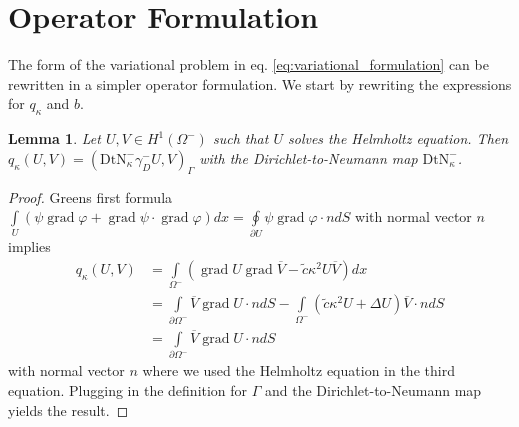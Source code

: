 \documentclass[12pt,journal,compsoc, onecolumn]{IEEEtran}
\newtheorem{lemma}[theorem]{Lemma}
\begin{document}


\section{Operator Formulation}
\label{section:operator_formulation}
The form of the variational problem in eq. \ref{eq:variational_formulation} can be rewritten in a simpler  operator formulation. 
We start by rewriting the expressions for $q_\kappa$ and $b$. 
\begin{lemma}\label{lem:reduced_q}
    Let $U, V \in H^{1}(\Omega^-)$ such that $U$ solves the Helmholtz equation. 
    Then $q_\kappa(U, V) = (\mathrm{DtN}_{ \kappa}^{-}\gamma_D^-U, V)_{\Gamma}$ with the
     Dirichlet-to-Neumann map $\mathrm{DtN}_{ \kappa}^{-}$.
\end{lemma}
\begin{proof}
    Greens first formula 
    \(\int\limits_{U}(\psi \operatorname{grad} \varphi+\operatorname{grad} \psi \cdot \operatorname{grad} \varphi) dx=
    \oint\limits_{\partial U} \psi \operatorname{grad} \varphi \cdot n dS\) with normal vector $n$
    implies 
\begin{align}
    q_\kappa(U, V) &= \int\limits_{\Omega^-} ( \operatorname{grad} U \operatorname{grad} \overline{V} -  \tilde c\kappa^2U \overline{V})dx \nonumber \\
    &= \int\limits_{ \partial \Omega^-} \overline{V} \operatorname{grad} U \cdot nd {S} - \int\limits_{\Omega^{-}} {( \tilde c\kappa^2 U + \Delta U)}\overline{V} \cdot nd{S}  \nonumber  \\
    &= \int\limits_{ \partial \Omega^-} \overline{V} \operatorname{grad} U \cdot nd {S} \nonumber
\end{align}
 with normal vector $n$ where we used the Helmholtz equation in the third equation.
 Plugging in the definition for $\Gamma$ and the Dirichlet-to-Neumann map yields the result.
\end{proof}  \noindent
\end{document}
